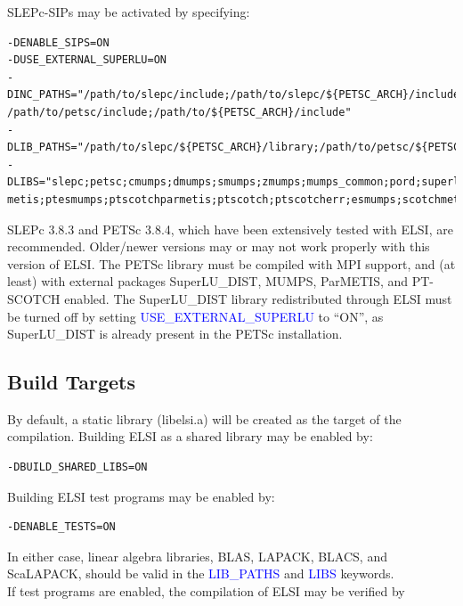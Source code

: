 \documentclass{report}
\begin{document}
SLEPc-SIPs may be activated by specifying:\\

\begin{verbatim}
-DENABLE_SIPS=ON
-DUSE_EXTERNAL_SUPERLU=ON
-DINC_PATHS="/path/to/slepc/include;/path/to/slepc/${PETSC_ARCH}/include;
/path/to/petsc/include;/path/to/${PETSC_ARCH}/include"
-DLIB_PATHS="/path/to/slepc/${PETSC_ARCH}/library;/path/to/petsc/${PETSC_ARCH}/library"
-DLIBS="slepc;petsc;cmumps;dmumps;smumps;zmumps;mumps_common;pord;superlu_dist;parmetis;
metis;ptesmumps;ptscotchparmetis;ptscotch;ptscotcherr;esmumps;scotchmetis;scotch;scotcherr"
\end{verbatim}

SLEPc 3.8.3 and PETSc 3.8.4, which have been extensively tested with ELSI, are recommended.  Older/newer versions may or may not work properly with this version of ELSI.  The PETSc library must be compiled with MPI support, and (at least) with external packages SuperLU\_DIST, MUMPS, ParMETIS, and PT-SCOTCH enabled.  The SuperLU\_DIST library redistributed through ELSI must be turned off by setting \textcolor{blue}{USE\_EXTERNAL\_SUPERLU} to ``ON'', as SuperLU\_DIST is already present in the PETSc installation.\\

\subsection{Build Targets}
\label{subsec:config_targets}
By default, a static library (libelsi.a) will be created as the target of the compilation.  Building ELSI as a shared library may be enabled by:\\

\begin{verbatim}
-DBUILD_SHARED_LIBS=ON
\end{verbatim}

Building ELSI test programs may be enabled by:\\

\begin{verbatim}
-DENABLE_TESTS=ON
\end{verbatim}

In either case, linear algebra libraries, BLAS, LAPACK, BLACS, and ScaLAPACK, should be valid in the \textcolor{blue}{LIB\_PATHS} and \textcolor{blue}{LIBS} keywords.\\

If test programs are enabled, the compilation of ELSI may be verified by\\
\end{document}

